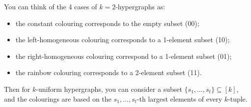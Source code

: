 \documentclass[main.tex]{subfiles}
\begin{document}
You can think of the 4 cases of $k=2$-hypergraphs as:
\begin{itemize}
  \item the constant colouring corresponds to the empty subset (00);
  \item the left-homogeneous colouring corresponds to a 1-element subset (10);
  \item the right-homogeneous colouring correspond to a 1-element subset (01);
  \item the rainbow colouring corresponds to a 2-element subset (11).
\end{itemize}

Then for $k$-uniform hypergraphs, you can consider a subset
$\{s_1,\ldots,s_t\}\subseteq [k]$, and the colourings are based on the
$s_1,\ldots,s_t$-th largest elements of every $k$-tuple.
\end{document}
